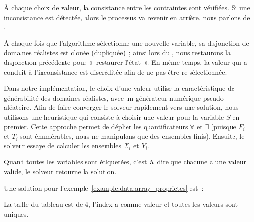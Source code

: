 À chaque choix de valeur, la consistance entre les contraintes sont
vérifiées. Si une inconsistance est détectée, alors le processus va revenir en
arrière, nous parlons de .

À chaque fois que l'algorithme sélectionne une nouvelle variable, sa disjonction
de domaines réalistes est clonée (dupliquée)~; ainsi lors du
, nous restaurons la disjonction précédente pour
«~restaurer l'état~». En même temps, la valeur qui a conduit à l'inconsistance
est discréditée afin de ne pas être re-sélectionnée.

Dans notre implémentation, le choix d'une valeur utilise la caractéristique de
générabilité des domaines réalistes, avec un générateur numérique
pseudo-aléatoire. Afin de faire converger le solveur rapidement vers une
solution, nous utilisons une heuristique qui consiste à choisir une valeur pour
la variable $S$ en premier.  Cette approche permet de déplier les
quantificateurs $\forall$ et $\exists$ (puisque $F_i$ et $T_i$ sont énumérables,
nous ne manipulons que des ensembles finis). Ensuite, le solveur essaye de
calculer les ensembles $X_i$ et $Y_i$.

Quand toutes les variables sont étiquetées, c'est~à~dire que chacune a une
valeur valide, le solveur retourne la solution.

\begin{example}

Une solution pour l'exemple~\ref{example:data:array_proprietes} est~:
%
\begin{pre}
[ \\
    0 => 'c', \\
    1 => 'd', \\
    2 => 'a', \\
    3 => 'e' \\
]
\end{pre}
%
La taille du tableau est de 4, l'index  a comme valeur  et
toutes les valeurs sont uniques.

\end{example}
